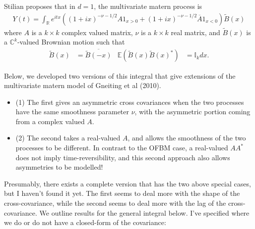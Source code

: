 \documentclass[11pt]{article}
\begin{document}
Stilian proposes that in $d=1$, the multivariate matern process is \begin{align*}
 Y(t) = \int_{\mathbb{R}} e^{itx} \left((1 + ix)^{-\nu - 1/2}A 1_{x > 0} + (1 + ix)^{-\nu-1/2} \overline{A}1_{x < 0}\right) \tilde{B}(x)
\end{align*}where $A$ is a $k\times k$ complex valued matrix, $\nu$ is a $k\times k$ real matrix, and $\tilde{B}(x)$ is a $\mathbb{C}^k$-valued Brownian motion such that \begin{align*}
\tilde{B}(x) &= \overline{\tilde{B}(-x)} & \mathbb{E}(\tilde{B}(x) \tilde{B}(x) ^*) &=\mathbb{I}_k dx.
\end{align*}




Below, we developed two versions of this integral that give extensions of the multivariate matern model of Gneiting et al (2010). 
\begin{itemize}
\item (1) The first gives an asymmetric cross covariances when the two processes have the same smoothness parameter $\nu$, with the asymmetric portion coming from a complex valued $A$. 
\item (2) The second takes a real-valued $A$, and allows the smoothness of the two processes to be different. In contrast to the OFBM case, a real-valued $AA^*$ does not imply time-reversibility, and this second approach also allows asymmetries to be modelled!
\end{itemize}
Presumably, there exists a complete version that has the two above special cases, but I haven't found it yet. The first seems to deal more with the shape of the cross-covariance, while the second seems to deal more with the lag of the cross-covariance. 
We outline results for the general integral below. 
I've specified where we do or do not have a closed-form of the covariance:
\end{document}
